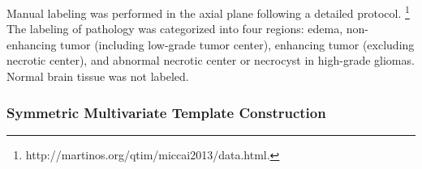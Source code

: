 \documentclass[final,5p,times,twocolumn]{elsarticle}
\begin{document}
Manual labeling was performed in the axial plane following a detailed
protocol.%
\footnote{
http://martinos.org/qtim/miccai2013/data.html.
}
The labeling of pathology was categorized into four regions:
edema, non-enhancing tumor (including low-grade tumor center), 
enhancing tumor (excluding necrotic center), and abnormal
necrotic center or necrocyst in high-grade gliomas.
Normal brain tissue was not labeled. 

% 
%

\subsubsection{Symmetric Multivariate Template Construction}
\end{document}

